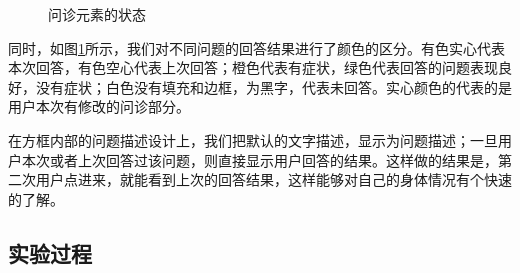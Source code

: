 \begin{figure}[h]
    \centering
    \caption{问诊元素的状态}
    \label{fig:question_status}
\end{figure}

同时，如图\ref{fig:question_status}所示，我们对不同问题的回答结果进行了颜色的区分。有色实心代表本次回答，有色空心代表上次回答；橙色代表有症状，绿色代表回答的问题表现良好，没有症状；白色没有填充和边框，为黑字，代表未回答。实心颜色的代表的是用户本次有修改的问诊部分。

在方框内部的问题描述设计上，我们把默认的文字描述，显示为问题描述；一旦用户本次或者上次回答过该问题，则直接显示用户回答的结果。这样做的结果是，第二次用户点进来，就能看到上次的回答结果，这样能够对自己的身体情况有个快速的了解。


\subsection{实验过程}

